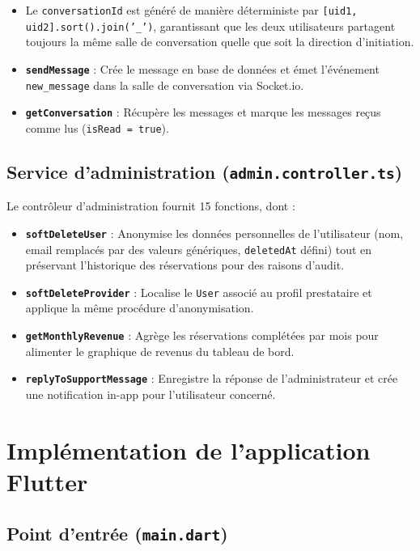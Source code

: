 \begin{itemize}
    \item Le \texttt{conversationId} est généré de manière déterministe par \texttt{[uid1, uid2].sort().join('\_')}, garantissant que les deux utilisateurs partagent toujours la même salle de conversation quelle que soit la direction d'initiation.
    \item \textbf{\texttt{sendMessage}} : Crée le message en base de données et émet l'événement \texttt{new\_message} dans la salle de conversation via Socket.io.
    \item \textbf{\texttt{getConversation}} : Récupère les messages et marque les messages reçus comme lus (\texttt{isRead = true}).
\end{itemize}

\subsection{Service d'administration (\texttt{admin.controller.ts})}

Le contrôleur d'administration fournit 15 fonctions, dont :

\begin{itemize}
    \item \textbf{\texttt{softDeleteUser}} : Anonymise les données personnelles de l'utilisateur (nom, email remplacés par des valeurs génériques, \texttt{deletedAt} défini) tout en préservant l'historique des réservations pour des raisons d'audit.
    \item \textbf{\texttt{softDeleteProvider}} : Localise le \texttt{User} associé au profil prestataire et applique la même procédure d'anonymisation.
    \item \textbf{\texttt{getMonthlyRevenue}} : Agrège les réservations complétées par mois pour alimenter le graphique de revenus du tableau de bord.
    \item \textbf{\texttt{replyToSupportMessage}} : Enregistre la réponse de l'administrateur et crée une notification in-app pour l'utilisateur concerné.
\end{itemize}

\section{Implémentation de l'application Flutter}

\subsection{Point d'entrée (\texttt{main.dart})}

